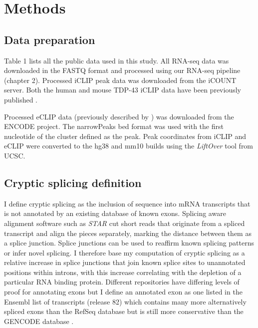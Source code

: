 


\section{Methods}

\subsection{Data preparation}
Table 1 lists all the public data used in this study. All RNA-seq data was downloaded in the FASTQ format and processed using our RNA-seq pipeline (chapter 2).
Processed iCLIP peak data was downloaded from the iCOUNT server. Both the human and mouse TDP-43 iCLIP data have been previously published \citep{Tollervey2011,Rogelj2012}.

Processed eCLIP data (previously described by \citep{Van_Nostrand2016-su}) was downloaded from the ENCODE project. The narrowPeaks bed format was used with the first nucleotide of the cluster defined as the peak. Peak coordinates from iCLIP and eCLIP were converted to the hg38 and mm10 builds using the \emph{LiftOver} tool from UCSC. 

\subsection{Cryptic splicing definition}
I define cryptic splicing as the inclusion of sequence into mRNA transcripts that is not annotated by an existing database of known exons. 
Splicing aware alignment software such as \emph{STAR} \citep{Dobin2013-ra} cut short reads that originate from a spliced transcript and align the pieces separately, marking the distance between them as a splice junction. Splice junctions can be used to reaffirm known splicing patterns or infer novel splicing. I therefore base my computation of cryptic splicing as a relative increase in splice junctions that join known splice sites to unannotated positions within introns, with this increase correlating with the depletion of a particular RNA binding protein. 
Different repositories have differing levels of proof for annotating exons but I define an annotated exon as one listed in the Ensembl list of transcripts (release 82) \citep{Cunningham2015} which contains many more alternatively spliced exons than the RefSeq database \citep{Pruitt2014} but is still more conservative than the GENCODE database \citep{Harrow2012}.

